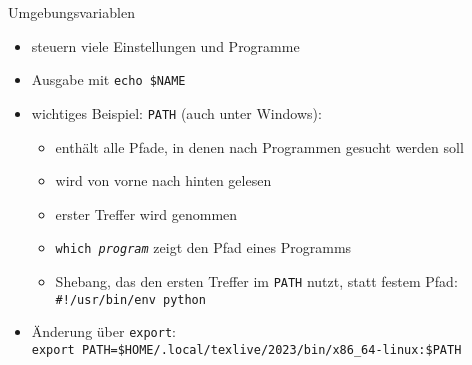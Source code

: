 \begin{frame}{Umgebungsvariablen}
  \begin{itemize}
    \item steuern viele Einstellungen und Programme
    \item Ausgabe mit \texttt{echo \$NAME}
    \item wichtiges Beispiel: \texttt{PATH} (auch unter Windows):
      \begin{itemize}
        \item enthält alle Pfade, in denen nach Programmen gesucht werden soll
        \item wird von vorne nach hinten gelesen
        \item erster Treffer wird genommen
        \item \texttt{which \textit{program}} zeigt den Pfad eines Programms
        \item Shebang, das den ersten Treffer im \texttt{PATH} nutzt, statt festem Pfad: \texttt{\#!/usr/bin/env python}
      \end{itemize}
    \item Änderung über \texttt{export}:\\
      \texttt{export PATH=\$HOME/.local/texlive/2023/bin/x86\_64-linux:\$PATH}
  \end{itemize} 
\end{frame}

